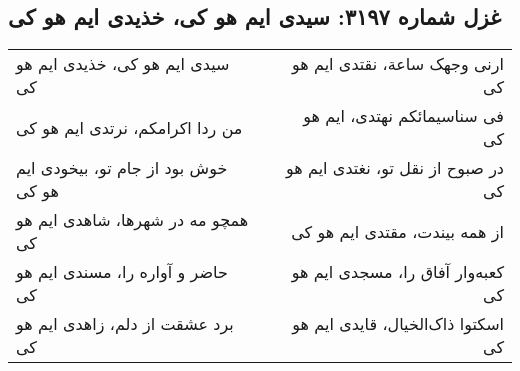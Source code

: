 \begin{center}
\section*{غزل شماره ۳۱۹۷: سیدی ایم هو کی، خذیدی ایم هو کی}
\label{sec:3197}
\begin{longtable}{l p{0.5cm} r}
سیدی ایم هو کی، خذیدی ایم هو کی
&&
ارنی وجهک ساعة، نقتدی ایم هو کی
\\
من ردا اکرامکم، نرتدی ایم هو کی
&&
فی سناسیمائکم نهتدی، ایم هو کی
\\
خوش بود از جام تو، بیخودی ایم هو کی
&&
در صبوح از نقل تو، نغتدی ایم هو کی
\\
همچو مه در شهرها، شاهدی ایم هو کی
&&
از همه بیندت، مقتدی ایم هو کی
\\
حاضر و آواره را، مسندی ایم هو کی
&&
کعبه‌وار آفاق را، مسجدی ایم هو کی
\\
برد عشقت از دلم، زاهدی ایم هو کی
&&
اسکتوا ذاک‌الخیال، قایدی ایم هو کی
\\
\end{longtable}
\end{center}

